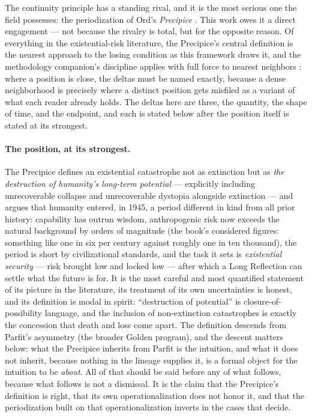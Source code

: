 The continuity principle has a standing rival, and it is the most
serious one the field possesses: the periodization of Ord's
\emph{Precipice} \cite{Ord20}. This work owes it a direct engagement
--- not because the rivalry is total, but for the opposite reason. Of
everything in the existential-risk literature, the Precipice's central
definition is the nearest approach to the losing condition as this
framework draws it, and the methodology companion's discipline applies
with full force to nearest neighbors \cite{AethusMethodology}: where a
position is close, the deltas must be named exactly, because a dense
neighborhood is precisely where a distinct position gets misfiled as a
variant of what each reader already holds. The deltas here are three, the quantity, the shape of time, and the endpoint, and each is
stated below after the position itself is stated at its strongest.

\paragraph{The position, at its strongest.} The Precipice defines an
existential catastrophe not as extinction but as \emph{the destruction
of humanity's long-term potential} --- explicitly including
unrecoverable collapse and unrecoverable dystopia alongside extinction
--- and argues that humanity entered, in 1945, a period different in
kind from all prior history: capability has outrun wisdom, anthropogenic
risk now exceeds the natural background by orders of magnitude (the
book's considered figures: something like one in six per century
against roughly one in ten thousand), the period is short by
civilizational standards, and the task it sets is \emph{existential
security} --- risk brought low and locked low --- after which a Long
Reflection can settle what the future is for. It is the most careful
and most quantified statement of its picture in the literature, its
treatment of its own uncertainties is honest, and its definition is
modal in spirit: ``destruction of potential'' is closure-of-possibility
language, and the inclusion of non-extinction catastrophes is exactly
the concession that death and loss come apart. The definition
descends from Parfit's asymmetry \cite{Parfit84}
(the broader Golden program), and the descent matters below:
what the Precipice inherits from Parfit is the intuition, and what it
does not inherit, because nothing in the lineage supplies it, is
a formal object for the intuition to be \emph{about}. All of that should be
said before any of what follows, because what follows is not a
dismissal. It is the claim that the Precipice's definition is right,
that its own operationalization does not honor it, and that the
periodization built on that operationalization inverts in the cases
that decide.

